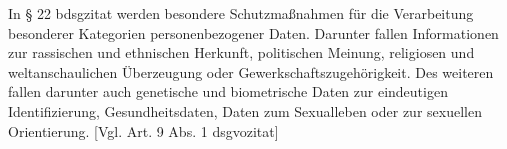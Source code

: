 In § 22 \gls{bdsgzitat} werden besondere Schutzmaßnahmen für die Verarbeitung besonderer Kategorien personenbezogener Daten. Darunter fallen Informationen zur rassischen und ethnischen Herkunft, politischen Meinung, religiosen und weltanschaulichen Überzeugung oder Gewerkschaftszugehörigkeit. Des weiteren fallen darunter auch genetische und biometrische Daten zur eindeutigen Identifizierung, Gesundheitsdaten, Daten zum Sexualleben oder zur sexuellen Orientierung. [Vgl. Art. 9 Abs. 1 \gls{dsgvozitat}]



